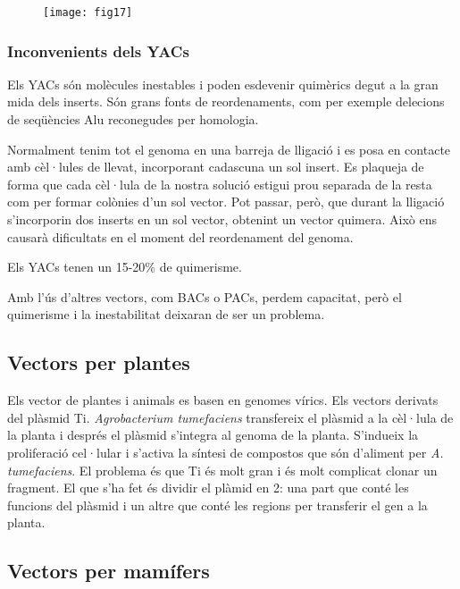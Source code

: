 \begin{figure}[H]
\centering
\texttt{[image: fig17]}
\end{figure}

\subsubsection{Inconvenients dels YACs}
Els YACs són molècules inestables i poden esdevenir quimèrics degut a la gran mida dels inserts. Són grans fonts de reordenaments, com per exemple delecions de seqüències Alu reconegudes per homologia.

Normalment tenim tot el genoma en una barreja de lligació i es posa en contacte amb cèl·lules de llevat, incorporant cadascuna un sol insert. Es plaqueja de forma que cada cèl·lula de la nostra solució estigui prou separada de la resta com per formar colònies d'un sol vector. Pot passar, però, que durant la lligació s'incorporin dos inserts en un sol vector, obtenint un vector quimera. Això ens causarà dificultats en el moment del reordenament del genoma.

Els YACs tenen un 15-20\% de quimerisme.

Amb l'ús d'altres vectors, com BACs o PACs, perdem capacitat, però el quimerisme i la inestabilitat deixaran de ser un problema.

\subsection{Vectors per plantes}
\label{sec:vectors-de-plantes}
Els vector de plantes i animals es basen en genomes vírics. Els vectors derivats del plàsmid Ti. \textit{Agrobacterium tumefaciens} transfereix el plàsmid a la cèl·lula de la planta i després el plàsmid s'integra al genoma de la planta. S'indueix la proliferació cel·lular i s'activa la síntesi de compostos que són d'aliment per \textit{A. tumefaciens}. El problema és que Ti és molt gran i és molt complicat clonar un fragment. El que s'ha fet és dividir el plàmid en 2: una part que conté les funcions del plàsmid i un altre que conté les regions per transferir el gen a la planta.

\subsection{Vectors per mamífers}
\label{sec:vectors-per-mamifers}
